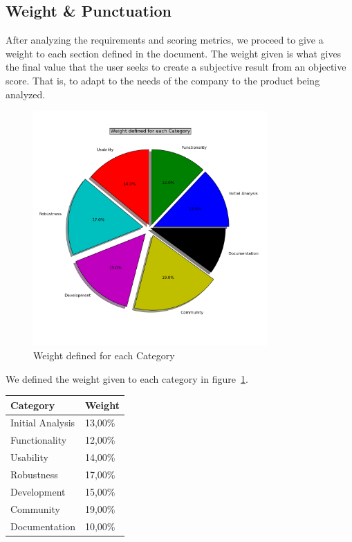\documentclass[11pt]{scrartcl}
\begin{document}
\subsection{Weight \& Punctuation}

After analyzing the requirements and scoring metrics, we proceed to give a weight to each section defined in the document. The weight given is what gives the final value that the user seeks to create a subjective result from an objective score. That is, to adapt to the needs of the company to the product being analyzed.

\begin{figure}[H]
\begin{center}
  \includegraphics[width=0.8\textwidth]{libcsvanaly2/script_sample/vcs-scm-weight-analysis-piechart.png}
  \caption{Weight defined for each Category}
  \label{fig:weight-metrics}
\end{center}
\end{figure}

We defined the weight given to each category in figure~\ref{fig:weight-metrics}.

\begin{table}[H]
\centering
\begin{tabular}{|l|l|}
    \hline Category & Weight\\
    \hline Initial Analysis	 & 13,00\%\\
    \hline Functionality & 12,00\%\\
    \hline Usability & 14,00\%\\
    \hline Robustness & 17,00\%\\
    \hline Development & 15,00\%\\
    \hline Community & 19,00\%\\
    \hline Documentation & 10,00\%\\
    \hline
\end{tabular}
\end{table}
\end{document}
